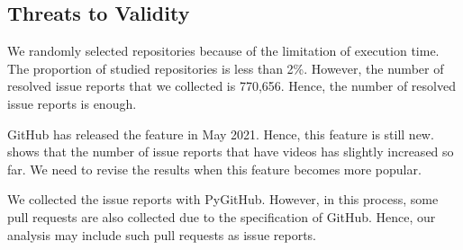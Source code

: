 \subsection{Threats to Validity}
\label{sec:limitation}

We randomly selected 
repositories because of the limitation of execution time. 
The proportion of studied repositories is less than 2\%. 
However, the number of resolved issue reports that 
we collected is 770,656. 
Hence, the number of resolved issue reports is enough. 

GitHub has released the feature in May 2021. 
Hence, this feature is still new. 
 shows that the number of 
issue reports that have videos has slightly increased so far.
We need to revise the results when this feature becomes more popular. 

We collected the issue reports with PyGitHub. 
However, in this process, some pull requests 
are also collected due to the specification of GitHub. 
Hence, our analysis may include such pull requests as issue reports. 
